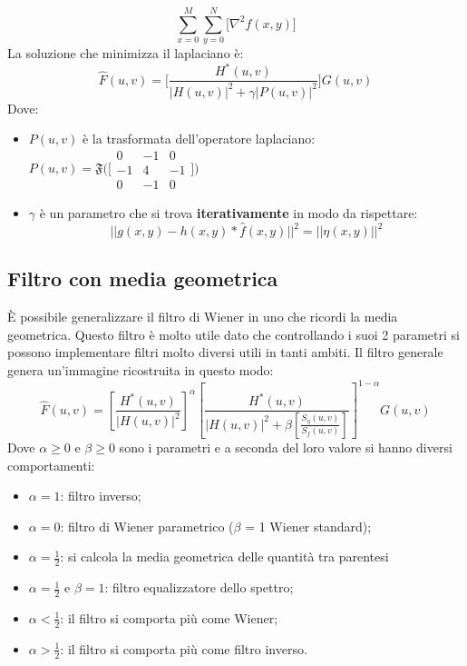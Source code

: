 \begin{equation}
	\sum_{x=0}^{M}\sum_{y=0}^{N} \big[\nabla^2f(x,y)\big]
\end{equation}
La soluzione che minimizza il laplaciano è:
\begin{equation}
	\hat{F}(u,v) = \Bigg[\frac{H^*(u,v)}{|H(u,v)|^2 + \gamma|P(u,v)|^2}\Bigg]G(u,v)
\end{equation}
Dove:
\begin{itemize}
	\item $P(u,v)$ è la trasformata dell'operatore laplaciano: $P(u,v) = \mathfrak{F} \Big( \Big[
	\begin{smallmatrix}
		0&-1&0\\
		-1&4&-1\\
		0&-1&0
	\end{smallmatrix} \Big]\Big)$ 
	\item $\gamma$ è un parametro che si trova \textbf{iterativamente} in modo da rispettare:
	\begin{equation}
		||g(x,y) - h(x,y)*\hat{f}(x,y)||^2 = ||\eta(x,y)||^2
	\end{equation}
\end{itemize}

\subsection{Filtro con media geometrica}
È possibile generalizzare il filtro di Wiener in uno che ricordi la media geometrica. Questo filtro è molto utile dato che controllando i suoi 2 parametri si possono implementare filtri molto diversi utili in tanti ambiti. Il filtro generale genera un'immagine ricostruita in questo modo:
\begin{equation}
	\hat{F}(u,v) = \left[\frac{H^*(u,v)}{|H(u,v)|^2}\right]^{\alpha}\left[\frac{H^*(u,v)}{|H(u,v)|^2 +\beta\left[\frac{S_{\eta}(u,v)}{S_f(u,v)}\right]}\right]^{1-\alpha}G(u,v)
\end{equation}
Dove $\alpha \geq 0$ e $\beta \geq 0$ sono i parametri e a seconda del loro valore si hanno diversi comportamenti:
\begin{itemize}
	\item $\alpha = 1$: filtro inverso;
	\item $\alpha = 0$: filtro di Wiener parametrico ($\beta$ = 1 Wiener standard);
	\item $\alpha = \frac{1}{2}$: si calcola la media geometrica delle quantità tra parentesi
	\item $\alpha = \frac{1}{2}$ e $\beta = 1$: filtro equalizzatore dello spettro;
	\item $\alpha<\frac{1}{2}$: il filtro si comporta più come Wiener;
	\item $\alpha>\frac{1}{2}$: il filtro si comporta più come filtro inverso.
\end{itemize}
